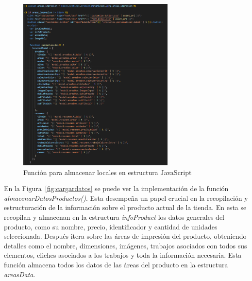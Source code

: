 \documentclass[11pt]{article}
\begin{document}
\begin{figure}[H]
    \centering
    \includegraphics[width=0.7\textwidth]{imagenesUS3-section/funcioncargarLocales.png}
    \caption{\label{fig:cargarlocales} Función para almacenar locales en estructura JavaScript}
    \vspace{\fill}
\end{figure}

En la Figura~\ref{fig:cargardatos} se puede ver la implementación de la función \textit{almacenarDatosProductos()}. Esta desempeña un papel crucial en 
la recopilación y estructuración de la información sobre el producto actual de la tienda. En esta se recopilan y almacenan en la estructura \textit{infoProduct} los datos generales del producto, como su nombre, precio, identificador y cantidad de
unidades seleccionada. Después itera sobre las áreas de impresión del producto, obteniendo detalles como el nombre, dimensiones, imágenes, trabajos asociados con todos sus elementos, cliches asociados a los trabajos y toda la información necesaria. Esta función
almacena todos los datos de las áreas del producto en la estructura \textit{areasData}.
\end{document}
